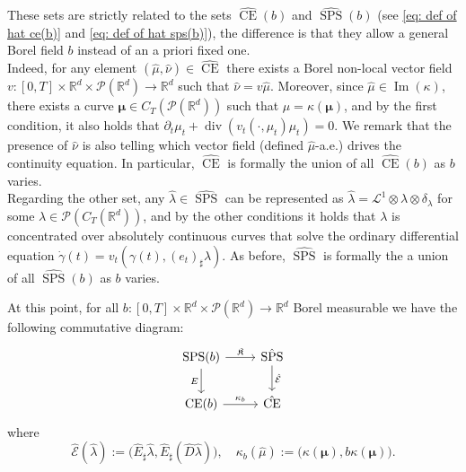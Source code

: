 \documentclass[10pt,leqno]{amsart}
\numberwithin{equation}{section}
\newcommand{\R}{\mathbb{R}}
\newcommand{\PP}{\mathcal{P}}
\newcommand{\CE}{\operatorname{CE}}
\begin{document}
These sets are strictly related to the sets $\hat{\operatorname{CE}}(b)$ and $\hat{\operatorname{SPS}}(b)$ (see \eqref{eq: def of hat ce(b)} and \eqref{eq: def of hat sps(b)}), the difference is that they allow a general Borel field $b$ instead of an a priori fixed one. 
\\
Indeed, for any element $(\hat{\mu},\hat{\nu}) \in \hat{\operatorname{CE}}$ there exists a Borel non-local vector field $v:[0,T]\times \R^d\times \PP(\R^d) \to \R^d$ such that $\hat\nu = v \hat\mu$. Moreover, since $\hat\mu\in \operatorname{Im}(\kappa)$, there exists a curve $\boldsymbol{\mu} \in C_T(\PP(\R^d))$ such that $\hat{\mu} = \kappa(\boldsymbol{\mu})$, and by the first condition, it also holds that $\partial_t \mu_t + \operatorname{div}(v_t(\cdot,\mu_t)\mu_t) = 0$. We remark that the presence of $\hat{\nu}$ is also telling which vector field (defined $\hat{\mu}$-a.e.) drives the continuity equation. In particular, $\hat{\operatorname{CE}}$ is formally the union of all $\hat{\operatorname{CE}}(b)$ as $b$ varies.
\\
Regarding the other set, any $\hat{\lambda}\in \hat{\operatorname{SPS}}$ can be represented as $\hat{\lambda} = \mathcal{L}^1\otimes \lambda \otimes \delta_\lambda$ for some $\lambda \in \PP(C_T(\R^d))$, and by the other conditions it holds that $\lambda$ is concentrated over absolutely continuous curves that solve the ordinary differential equation $\dot\gamma(t) = v_t(\gamma(t),(e_t)_\sharp \lambda)$. As before, $\hat{\operatorname{SPS}}$ is formally the a union of all $\hat{\operatorname{SPS}}(b)$ as $b$ varies.

 At this point, for all $b:[0,T]\times \R^d \times \PP(\R^d) \to \R^d$ Borel measurable we have the following commutative diagram:
 \begin{equation}\label{eq: comm diagram}
\begin{tikzcd}
  \operatorname{SPS}(b) \arrow[r, "\mathfrak{K}"] \arrow[d, "E"'] &  \hat{\operatorname{SPS}} \arrow[d, "\hat{\mathcal{E}}"]\\
  \CE(b) \arrow[r, "\kappa_b"] & \hat{\CE}
\end{tikzcd}
\end{equation}
where 
\[\hat{\mathcal{E}}(\hat{\lambda}) := \big(\hat{E}_\sharp  \hat{\lambda}, \hat{E}_\sharp (\hat{D}\hat{\lambda})\big), \quad \kappa_b(\hat{\mu}):= \big(\kappa(\boldsymbol{\mu}), b\kappa(\boldsymbol{\mu})\big).\]
\end{document}
